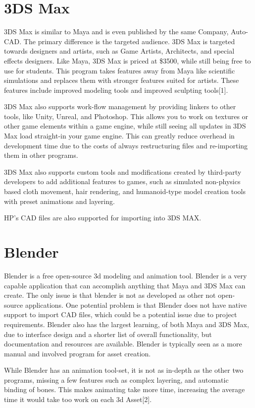\documentclass[onecolumn, draftclsnofoot,10pt, compsoc]{IEEEtran}
\begin{document}
\section{3DS Max}
3DS Max is similar to Maya and is even published by the same Company, Auto-CAD. The primary difference is the targeted audience. 3DS Max is targeted towards designers and artists, such as Game Artists, Architects, and special effects designers. Like Maya, 3DS Max is priced at \$3500, while still being free to use for students. This program takes features away from Maya like scientific simulations and replaces them with stronger features suited for artists. These features include improved modeling tools and improved sculpting tools[1]. 

3DS Max also supports work-flow management by providing linkers to other tools, like Unity, Unreal, and Photoshop. This allows you to work on textures or other game elements within a game engine, while still seeing all updates in 3DS Max load straight-in your game engine. This can greatly reduce overhead in development time due to the costs of always restructuring files and re-importing them in other programs. 

3DS Max also supports custom tools and modifications created by third-party developers to add additional features to games, such as simulated non-physics based cloth movement, hair rendering, and humanoid-type model creation tools with preset animations and layering.

HP’s CAD files are also supported for importing into 3DS MAX.

\section{Blender} 
Blender is a free open-source 3d modeling and animation tool. Blender is a very capable application that can accomplish anything that Maya and 3DS Max can create. The only issue is that blender is not as developed as other not open-source applications. One potential problem is that Blender does not have native support to import CAD files, which could be a potential issue due to project requirements. Blender also has the largest learning, of both Maya and 3DS Max, due to interface design and a shorter list of overall functionality, but documentation and resources are available. Blender is typically seen as a more manual and involved program for asset creation. 

While Blender has an animation tool-set, it is not as in-depth as the other two programs, missing a few features such as complex layering, and automatic binding of bones. This makes animating take more time, increasing the average time it would take too work on each 3d Asset[2]. 
\end{document}
